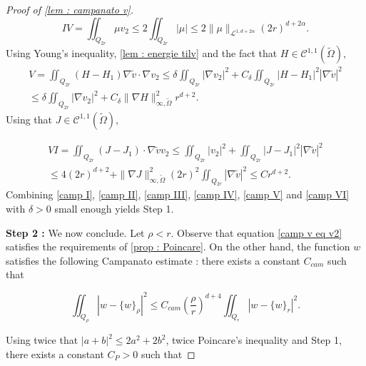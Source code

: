 \documentclass[reqno,12pt,twoside]{amsart}
\numberwithin{equation}{section} \numberwithin{theorem}{section}
\numberwithin{proposition}{section} \numberwithin{lemma}{section}
\numberwithin{corollary}{section}
\numberwithin{definition}{section} \numberwithin{remark}{section}
\begin{document}
\begin{proof}[Proof of \autoref{lem : campanato v}]
\begin{equation}\label{camp IV}
IV = \iint_{Q_{2r}} \mu v_2 \leqslant 2  \iint_{Q_{2r}} |\mu| \leqslant 2 \|\mu \|_{\mathcal{L}^{1,d+2\alpha}} (2r)^{d+2\alpha}.
\end{equation}
Using Young's inequality, \autoref{lem : energie tilv} and the fact that $H \in \mathcal{C}^{1,1}(\widetilde{\Omega})$, 
\begin{multline}\label{camp V}
V=\iint_{Q_{2r}} (H-H_1) \nabla \widetilde{v} \cdot \nabla v_2 \leqslant \delta \iint_{Q_{2r}} |\nabla v_2|^2 + C_\delta \iint_{Q_{2r}} |H-H_1|^2 |\nabla \widetilde{v}|^2 \\
 \leqslant \delta \iint_{Q_{2r}} |\nabla v_2|^2 + C_\delta \|\nabla H\|_{\infty, \widetilde{\Omega}}^2 r^{d+2}. 
\end{multline}
Using that $J \in \mathcal{C}^{1,1}(\widetilde{\Omega})$,

\begin{multline}\label{camp VI}
VI =\iint_{Q_{2r}} (J-J_1)\cdot \nabla \widetilde{v} v_2 \leqslant \iint_{Q_{2r}} |v_2|^2 +\iint_{Q_{2r}} |J-J_1|^2 |\nabla \widetilde{v}|^2\\
\leqslant 4(2r)^{d+2} + \|\nabla J\|_{\infty, \widetilde{\Omega}}^2 (2r)^2 \iint_{Q_{2r}} |\nabla \widetilde{v}|^2 \leqslant C r^{d+2}.
\end{multline}
Combining \eqref{camp I}, \eqref{camp II}, \eqref{camp III}, \eqref{camp IV}, \eqref{camp V} and \eqref{camp VI} with $\delta >0$ small enough yields Step 1. 

\medskip

\textbf{Step 2 :} We now conclude. Let $\rho < r$. Observe that equation \eqref{camp v eq v2} satisfies the requirements of \autoref{prop : Poincare}. On the other hand, the function $w$ satisfies the following Campanato estimate : there exists a constant $C_{cam}$ such that 

\[\iint_{Q_\rho} |w- \{w\}_\rho|^2 \leqslant C_{cam}\left(\frac{\rho}{r}\right)^{d+4}\iint_{Q_{r}} |w -\{w\}_{r}|^2.\]

Using twice that $|a+b|^2 \leqslant 2a^2 +2b^2$, twice Poincare's inequality and Step 1, there exists a constant $C_P>0$ such that  


\end{proof}
\end{document}
